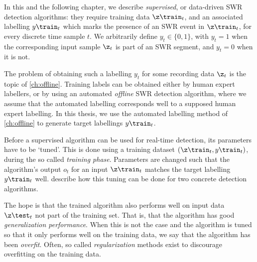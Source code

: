\label{sec:data-driven-algorithms}

In this and the following chapter, we describe \emph{supervised}, or data-driven SWR detection algorithms: they require training data $\z\train_t$, and an associated labelling $y\train_t$ which marks the presence of an SWR event in $\z\train_t$, for every discrete time sample $t$. We arbitrarily define $y_t \in \{0, 1\}$, with $y_t = 1$ when the corresponding input sample $\z_t$ is part of an SWR segment, and $y_t = 0$ when it is not.

The problem of obtaining such a labelling $y_t$ for some recording data $\z_t$ is the topic of \cref{ch:offline}. Training labels can be obtained either by human expert labellers, or by using an automated \emph{offline} SWR detection algorithm, where we assume that the automated labelling corresponds well to a supposed human expert labelling. In this thesis, we use the automated labelling method of \cref{ch:offline} to generate target labellings $y\train_t$.

Before a supervised algorithm can be used for real-time detection, its parameters have to be `tuned'. This is done using a training dataset $(\z\train_t, y\train_t)$, during the so called \emph{training phase}. Parameters are changed such that the algorithm's output $o_t$ for an input $\z\train_t$ matches the target labelling $y\train_t$ well.  describe how this tuning can be done for two concrete detection algorithms.

The hope is that the trained algorithm also performs well on input data $\z\test_t$ not part of the training set. That is, that the algorithm has good \emph{generalization performance}. When this is not the case and the algorithm is tuned so that it only performs well on the training data, we say that the algorithm has been \emph{overfit}. Often, so called \emph{regularization} methods exist to discourage overfitting on the training data.
